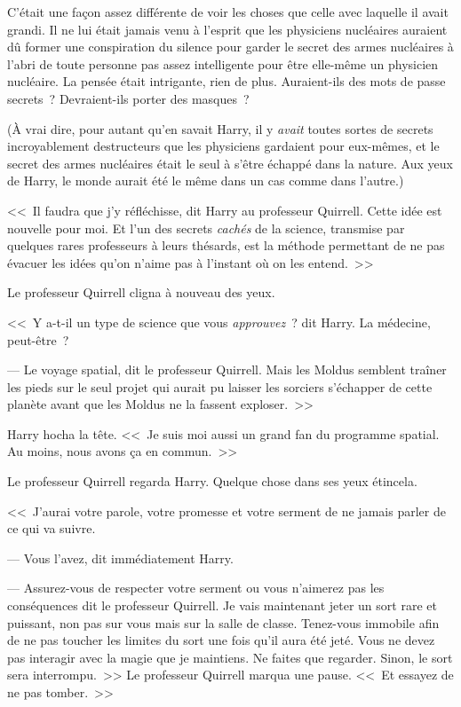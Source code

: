 C'était une façon assez différente de voir les choses que celle avec laquelle il avait grandi. Il ne lui était jamais venu à l'esprit que les physiciens nucléaires auraient dû former une conspiration du silence pour garder le secret des armes nucléaires à l'abri de toute personne pas assez intelligente pour être elle-même un physicien nucléaire. La pensée était intrigante, rien de plus. Auraient-ils des mots de passe secrets~? Devraient-ils porter des masques~?

(À vrai dire, pour autant qu'en savait Harry, il y \emph{avait} toutes sortes de secrets incroyablement destructeurs que les physiciens gardaient pour eux-mêmes, et le secret des armes nucléaires était le seul à s'être échappé dans la nature. Aux yeux de Harry, le monde aurait été le même dans un cas comme dans l'autre.)

<<~Il faudra que j'y réfléchisse, dit Harry au professeur Quirrell. Cette idée est nouvelle pour moi. Et l'un des secrets \emph{cachés} de la science, transmise par quelques rares professeurs à leurs thésards, est la méthode permettant de ne pas évacuer les idées qu'on n'aime pas à l'instant où on les entend.~>>

Le professeur Quirrell cligna à nouveau des yeux.

<<~Y a-t-il un type de science que vous \emph{approuvez}~? dit Harry. La médecine, peut-être~?

--- Le voyage spatial, dit le professeur Quirrell. Mais les Moldus semblent traîner les pieds sur le seul projet qui aurait pu laisser les sorciers s'échapper de cette planète avant que les Moldus ne la fassent exploser.~>>

Harry hocha la tête. <<~Je suis moi aussi un grand fan du programme spatial. Au moins, nous avons ça en commun.~>>

Le professeur Quirrell regarda Harry. Quelque chose dans ses yeux étincela.

<<~J'aurai votre parole, votre promesse et votre serment de ne jamais parler de ce qui va suivre.

--- Vous l'avez, dit immédiatement Harry.

--- Assurez-vous de respecter votre serment ou vous n'aimerez pas les conséquences dit le professeur Quirrell. Je vais maintenant jeter un sort rare et puissant, non pas sur vous mais sur la salle de classe. Tenez-vous immobile afin de ne pas toucher les limites du sort une fois qu'il aura été jeté. Vous ne devez pas interagir avec la magie que je maintiens. Ne faites que regarder. Sinon, le sort sera interrompu.~>> Le professeur Quirrell marqua une pause. <<~Et essayez de ne pas tomber.~>>

